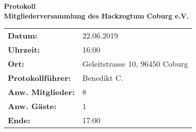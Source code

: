 

\newcommand{\myTitle}{
Mitgliederversammlung des Hackzogtum Coburg e.V.
}

\newcommand{\myDate}{
22.06.2019
}  
\newcommand{\myTime}{
16:00
}

\newcommand{\myTimeEnd}{
17:00
}
  
\newcommand{\myPlace}{
Geleitstrasse 10, 96450 Coburg
}  
\newcommand{\myAuthor}{
Benedikt C.
} 
\newcommand{\myChief}{
        Florian O.
}
\newcommand{\myMember}{
8
} \newcommand{\myGuests}{
1
}  


\begin{center}

        \begin{huge}
                \textbf{ Protokoll \\ \vspace{15px} \myTitle}
        \end{huge}

\end{center}


\begin{table}[h]
        \centering
                \begin{tabular} {>{\bfseries}l l}
                
                        Datum: & \myDate \\  
                        Uhrzeit: & \myTime \\
                        Ort: & \myPlace \\
                        Protokollführer: & \myAuthor  \\
                        Anw. Mitglieder: & \myMember  \\
                        Anw. Gäste: & \myGuests  \\
                        Ende: & \myTimeEnd  \\
                \end{tabular}
\end{table}

               



